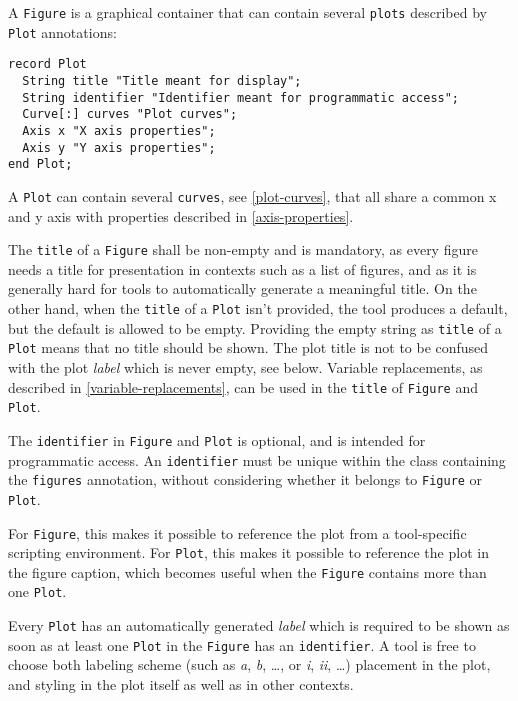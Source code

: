 A \lstinline!Figure! is a graphical container that can contain several
\lstinline!plots! described by \lstinline!Plot! annotations:
\begin{lstlisting}[language=modelica]
record Plot
  String title "Title meant for display";
  String identifier "Identifier meant for programmatic access";
  Curve[:] curves "Plot curves";
  Axis x "X axis properties";
  Axis y "Y axis properties";
end Plot;
\end{lstlisting}

A \lstinline!Plot! can contain several \lstinline!curves!, see
\autoref{plot-curves}, that all share a common x and y axis with properties
described in \autoref{axis-properties}.

The \lstinline!title! of a \lstinline!Figure! shall be non-empty and is
mandatory, as every figure needs a title for presentation in contexts such as a
list of figures, and as it is generally hard for tools to automatically generate
a meaningful title.  On the other hand, when the \lstinline!title! of a
\lstinline!Plot! isn't provided, the tool produces a default, but the default is
allowed to be empty.  Providing the empty string as \lstinline!title! of a
\lstinline!Plot! means that no title should be shown.  The plot title is not to
be confused with the plot \emph{label} which is never empty, see below. Variable
replacements, as described in \autoref{variable-replacements}, can be used in the
\lstinline!title! of \lstinline!Figure! and \lstinline!Plot!.

The \lstinline!identifier! in \lstinline!Figure! and \lstinline!Plot! is
optional, and is intended for programmatic access.  An \lstinline!identifier!
must be unique within the class containing the \lstinline!figures! annotation,
without considering whether it belongs to \lstinline!Figure! or
\lstinline!Plot!.

\begin{nonnormative}
For \lstinline!Figure!, this makes it possible to reference the plot from a
tool-specific scripting environment. For \lstinline!Plot!, this makes it
possible to reference the plot in the figure caption, which becomes useful when
the \lstinline!Figure! contains more than one \lstinline!Plot!.
\end{nonnormative}

Every \lstinline!Plot! has an automatically generated \emph{label} which is
required to be shown as soon as at least one \lstinline!Plot! in the
\lstinline!Figure! has an \lstinline!identifier!.  A tool is free to choose both
labeling scheme (such as \emph{a}, \emph{b}, \dots, or \emph{i}, \emph{ii}, \dots) placement in the plot,
and styling in the plot itself as well as in other contexts.

